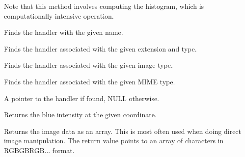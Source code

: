 
Note that this method involves computing the histogram, which is
computationally intensive operation.



Finds the handler with the given name.


Finds the handler associated with the given extension and type.


Finds the handler associated with the given image type.


Finds the handler associated with the given MIME type.






A pointer to the handler if found, NULL otherwise.



\label{wximagegetblue}


Returns the blue intensity at the given coordinate.

\label{wximagegetdata}


Returns the image data as an array. This is most often used when doing
direct image manipulation. The return value points to an array of
characters in RGBGBRGB... format.

\label{wximagegetgreen}

